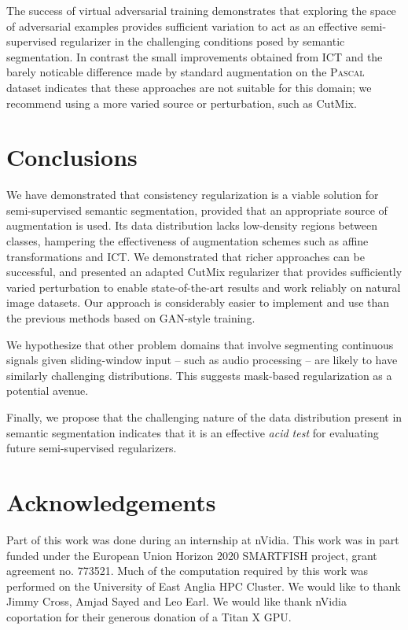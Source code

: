 \documentclass{bmvc2k}
\newcommand{\Pascal}{\textsc{Pascal}}
\begin{document}
The success of virtual adversarial training demonstrates that exploring the space of adversarial examples provides sufficient variation to act as an effective semi-supervised
regularizer in the challenging conditions posed by semantic segmentation. In contrast the small improvements obtained from ICT and the barely noticable difference made by standard augmentation 
on the \Pascal{} dataset indicates that these approaches are not suitable for this domain; we recommend using a more varied source or perturbation, such as CutMix.



\section{Conclusions}
\label{sec:conc}

We have demonstrated that consistency regularization is a viable solution for semi-supervised semantic segmentation, provided that an appropriate source of augmentation is used.
Its data distribution lacks low-density regions between classes, hampering the effectiveness of augmentation schemes such as affine transformations and ICT.
We demonstrated that richer approaches can be successful, and presented an adapted CutMix regularizer that provides sufficiently varied perturbation to enable state-of-the-art results and work reliably on natural image datasets.
Our approach is considerably easier to implement and use than the previous methods based on GAN-style training.

We hypothesize that other problem domains that involve segmenting continuous signals given sliding-window input -- such as audio processing -- are likely to have similarly challenging distributions. This suggests
mask-based regularization as a potential avenue.

Finally, we propose that the challenging nature of the data distribution present in semantic segmentation indicates that it is an effective \emph{acid test} for evaluating future semi-supervised regularizers.


\section*{Acknowledgements}

Part of this work was done during an internship at nVidia. This work was in part funded under the European Union Horizon 2020 SMARTFISH project, grant agreement no. 773521.
Much of the computation required by this work was performed on the University of East Anglia HPC Cluster.
We would like to thank Jimmy Cross, Amjad Sayed and Leo Earl.
We would like thank nVidia coportation for their generous donation of a Titan X GPU.
\end{document}
